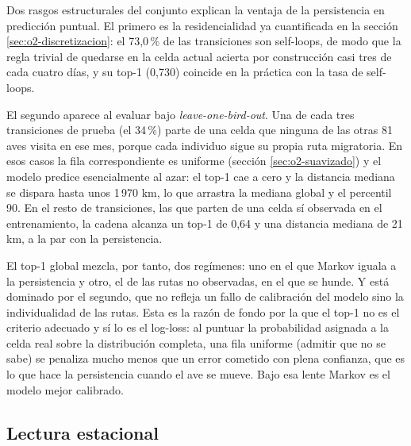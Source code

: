 Dos rasgos estructurales del conjunto explican la ventaja de la persistencia en
predicción puntual. El primero es la residencialidad ya cuantificada en la sección
\ref{sec:o2-discretizacion}: el 73,0\,\% de las transiciones son self-loops, de modo
que la regla trivial de quedarse en la celda
actual acierta por construcción casi tres de cada cuatro días, y su top-1 (0,730)
coincide en la práctica con la tasa de self-loops.

El segundo aparece al evaluar bajo \textit{leave-one-bird-out}. Una de cada tres
transiciones de prueba (el 34\,\%) parte de una celda que ninguna de las otras 81 aves
visita en ese mes, porque cada individuo sigue su propia ruta migratoria. En esos
casos la fila correspondiente es uniforme (sección \ref{sec:o2-suavizado}) y el modelo
predice esencialmente al azar: el top-1 cae a cero y la distancia mediana se dispara
hasta unos 1\,970 km, lo que arrastra la mediana global y el percentil 90. En el resto
de transiciones, las que parten de una celda sí observada en el entrenamiento, la
cadena alcanza un top-1 de 0,64 y una distancia mediana de 21 km, a la par con la
persistencia.

El top-1 global mezcla, por tanto, dos regímenes: uno en el que Markov iguala a la
persistencia y otro, el de las rutas no observadas, en el que se hunde. Y está
dominado por el segundo, que no refleja un fallo de calibración del modelo sino la
individualidad de las rutas. Esta es la razón de fondo por la que el top-1 no es el
criterio adecuado y sí lo es el log-loss: al puntuar la probabilidad asignada a la
celda real sobre la distribución completa, una fila uniforme (admitir que no se sabe)
se penaliza mucho menos que un error cometido con plena confianza, que es lo que hace
la persistencia cuando el ave se mueve. Bajo esa lente Markov es el modelo mejor
calibrado.

\subsection{Lectura estacional}
\label{sec:o2-estacional-resultados}

